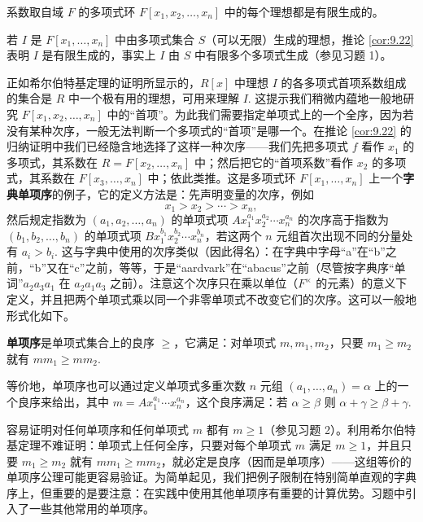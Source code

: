 \begin{corollary}\label{cor:9.22}
系数取自域 \(F\) 的多项式环 \(F[x_1, x_2, \ldots, x_n]\) 中的每个理想都是有限生成的。
\end{corollary}

若 \(I\) 是 \(F[x_1, \ldots, x_n]\) 中由多项式集合 \(S\)（可以无限）生成的理想，推论 \ref{cor:9.22} 表明 \(I\) 是有限生成的，事实上 \(I\) 由 \(S\) 中有限多个多项式生成（参见习题 1）。

正如希尔伯特基定理的证明所显示的，\(R[x]\) 中理想 \(I\) 的各多项式首项系数组成的集合是 \(R\) 中一个极有用的理想，可用来理解 \(I\). 这提示我们稍微内蕴地一般地研究 \(F[x_1, x_2, \ldots, x_n]\) 中的“首项”。为此我们需要指定单项式上的一个全序，因为若没有某种次序，一般无法判断一个多项式的“首项”是哪一个。在推论 \ref{cor:9.22} 的归纳证明中我们已经隐含地选择了这样一种次序——我们先把多项式 \(f\) 看作 \(x_1\) 的多项式，其系数在 \(R = F[x_2, \ldots, x_n]\) 中；然后把它的“首项系数”看作 \(x_2\) 的多项式，其系数在 \(F[x_3, \ldots, x_n]\) 中；依此类推。这是多项式环 \(F[x_1, \ldots, x_n]\) 上一个\textbf{字典单项序}的例子，它的定义方法是：先声明变量的次序，例如
\[
x_1 > x_2 > \cdots > x_n,
\]
然后规定指数为 \((a_1, a_2, \ldots, a_n)\) 的单项式项 \(Ax_1^{a_1}x_2^{a_2}\cdots x_n^{a_n}\) 的次序高于指数为 \((b_1, b_2, \ldots, b_n)\) 的单项式项 \(Bx_1^{b_1}x_2^{b_2}\cdots x_n^{b_n}\)，若这两个 \(n\) 元组首次出现不同的分量处有 \(a_i > b_i\). 这与字典中使用的次序类似（因此得名）：在字典中字母“a”在“b”之前，“b”又在“c”之前，等等，于是“aardvark”在“abacus”之前（尽管按字典序“单词”\(a_2a_3a_1\) 在 \(a_2a_1a_3\) 之前）。注意这个次序只在乘以单位（\(F^\times\) 的元素）的意义下定义，并且把两个单项式乘以同一个非零单项式不改变它们的次序。这可以一般地形式化如下。

\begin{definition}
\textbf{单项序}是单项式集合上的良序 \(\geq\)，它满足：对单项式 \(m, m_1, m_2\)，只要 \(m_1 \geq m_2\) 就有 \(mm_1 \geq mm_2\).

等价地，单项序也可以通过定义单项式多重次数 \(n\) 元组 \((a_1, \ldots, a_n) = \alpha\) 上的一个良序来给出，其中 \(m = Ax_1^{a_1}\cdots x_n^{a_n}\)，这个良序满足：若 \(\alpha \geq \beta\) 则 \(\alpha + \gamma \geq \beta + \gamma\).
\end{definition}

容易证明对任何单项序和任何单项式 \(m\) 都有 \(m \geq 1\)（参见习题 2）。利用希尔伯特基定理不难证明：单项式上任何全序，只要对每个单项式 \(m\) 满足 \(m \geq 1\)，并且只要 \(m_1 \geq m_2\) 就有 \(mm_1 \geq mm_2\)，就必定是良序（因而是单项序）——这组等价的单项序公理可能更容易验证。为简单起见，我们把例子限制在特别简单直观的字典序上，但重要的是要注意：在实践中使用其他单项序有重要的计算优势。习题中引入了一些其他常用的单项序。

